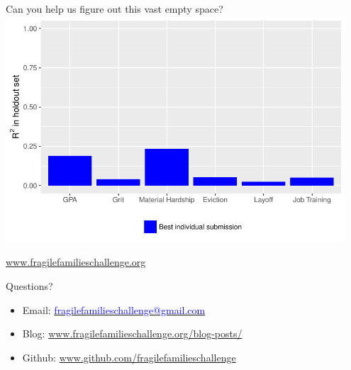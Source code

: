 \documentclass{beamer}
\begin{document}
\begin{frame}

\begin{center}
\Large Can you help us figure out this vast empty space?\\
\includegraphics[width=0.95\textwidth]{figures/Rsquared_all_01_bestindividual}
\end{center}

\end{frame}
\begin{frame}

\begin{center}
\Large{\textcolor{blue}{\href{http://www.fragilefamilieschallenge.org}{www.fragilefamilieschallenge.org}}} 
\end{center}

\vfill

Questions? 
\begin{itemize}
\item Email: \href{mailto:fragilefamilieschallenge@gmail.com}{\textcolor{blue}{fragilefamilieschallenge@gmail.com}} 
\item Blog: \small{\textcolor{blue}{\href{http://www.fragilefamilieschallenge.org/blog-posts/}{www.fragilefamilieschallenge.org/blog-posts/}}}
\item Github: \small{\textcolor{blue}{\href{http://github.com/fragilefamilieschallenge}{www.github.com/fragilefamilieschallenge}}}
\end{itemize}

\end{frame}
\end{document}

